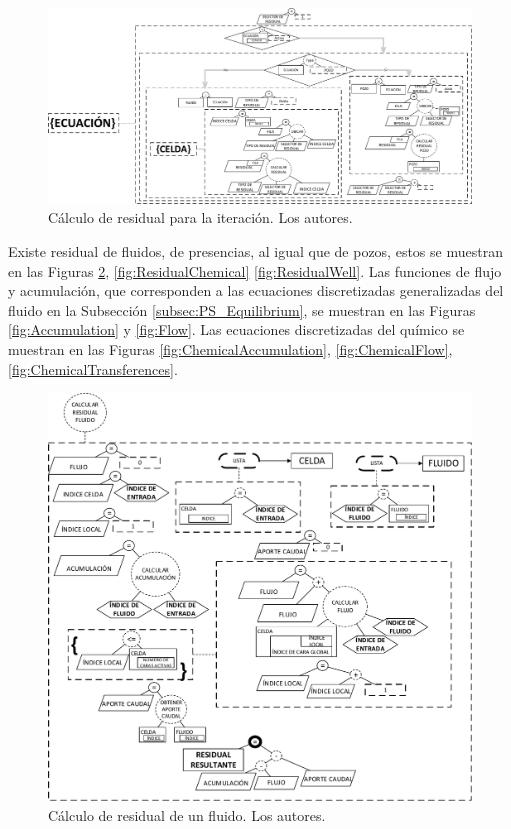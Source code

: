 \begin{figure}[h]
	\centering%
	\includegraphics[width=\linewidth]{Fig/Residual.pdf}%
	\caption[Cálculo de residual para la iteración.]{Cálculo de residual para la iteración. Los autores.} \label{fig:Residual}
\end{figure}

Existe residual de fluidos, de presencias, al igual que de pozos, estos se muestran en las Figuras \ref{fig:ResidualFluid}, \ref{fig:ResidualChemical} \ref{fig:ResidualWell}. Las funciones de flujo y acumulación, que corresponden a las ecuaciones discretizadas generalizadas del fluido en la Subsección \ref{subsec:PS_Equilibrium}, se muestran en las Figuras \ref{fig:Accumulation} y \ref{fig:Flow}. Las ecuaciones discretizadas del químico se muestran en las Figuras \ref{fig:ChemicalAccumulation}, \ref{fig:ChemicalFlow}, \ref{fig:ChemicalTransferences}.\\

\begin{figure}[h]
	\centering%
	\includegraphics[width=0.9\linewidth]{Fig/CalcularResidualFluido.pdf}%
	\caption[Cálculo de residual de un fluido.]{Cálculo de residual de un fluido. Los autores.} \label{fig:ResidualFluid}
\end{figure}

